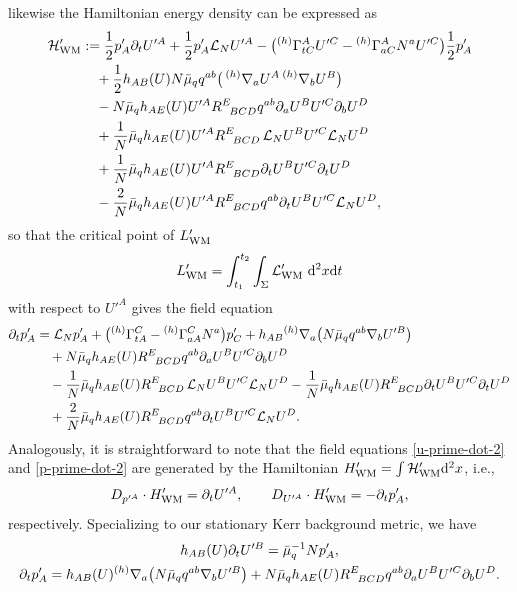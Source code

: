 \documentclass[pdftex]{sigma}
\def\ptl{\partial}%
\def\grad{{\nabla}}%
\newcommand{\leftexp}[2]{{\vphantom{#2}}^{#1}{#2}}
\def\halb{\frac{1}{2}}%
\numberwithin{equation}{section}
\begin{document}
likewise the Hamiltonian energy density can be expressed as
\begin{align*}
\mathcal{H}'_{{\rm WM}}
& := \halb p'_A \ptl_t U'^A + \halb p'_A \mathcal{L}_N U'^A -\bigl(\leftexp{(h)}{\Gamma}^A_{tC} U'^C - \leftexp{(h)}{\Gamma}^A_{a C} N^a U'^C \bigr)\halb p'_A \notag\\
&\quad{}+\halb h_{AB}(U) N \bar{\mu}_q q^{ab} \bigl(\,\leftexp{(h)}{\grad}_a U^A \, \leftexp{(h)}{\grad}_b U^B \bigr) \notag\\
&\quad{} - N \bar{\mu}_q h_{AE}(U) U'^A R^E_{\,\,\,\,BCD} q^{a b} \ptl_a U^B U'^C \ptl_b U^D \notag\\
&\quad{} +\frac{1}{N} \bar{\mu}_q h_{AE}(U) U'^A R^E_{\,\,\,\,BCD} \, \mathcal{L}_N U^B U'^C \mathcal{L}_N U^D \notag\\
&\quad{} + \frac{1}{N} \bar{\mu}_q h_{AE}(U) U'^A R^E_{\,\,\,\,BCD} \ptl_t U^B U'^C \ptl_t U^D \notag\\
&\quad{} - \frac{2}{N}\bar{\mu}_q h_{AE}(U) U'^A R^E_{\,\,\,\,BCD} q^{a b} \ptl_t U^B U'^C \mathcal{L}_N U^D,
\end{align*}
so that the critical point of $L'_{{\rm WM}}$
\begin{align*}
L'_{{\rm WM}} = \int^{t_2}_{t_1} \int_{\Sigma} \mathcal{L}'_{{\rm WM}} \,\, {\rm d}^2x {\rm d}t
\end{align*}
with respect to $U'^A$ gives the field equation
\begin{align}
\ptl_t p'_A &{}= \mathcal{L}_N p'_A + \bigl(\leftexp{(h)}{\Gamma} ^C_{tA} - \leftexp{(h)}{\Gamma}^C_{aA} N^a\bigr)p'_C + h_{AB} \leftexp{(h)}{\grad}_a \bigl(N \bar{\mu}_q q^{ab} \grad_b U'^B\bigr) \notag\\
&\quad{} + N \bar{\mu}_q h_{AE}(U) R^E_{\,\,\,\,BCD} q^{a b} \ptl_a U^B U'^C \ptl_b U^D \notag\\
&\quad{} -\frac{1}{N} \bar{\mu}_q h_{AE}(U) R^E_{\,\,\,\,BCD} \, \mathcal{L}_N U^B U'^C \mathcal{L}_N U^D
 - \frac{1}{N} \bar{\mu}_q h_{AE}(U) R^E_{\,\,\,\,BCD} \ptl_t U^B U'^C \ptl_t U^D \notag\\
&\quad{} + \frac{2}{N}\bar{\mu}_q h_{AE}(U) R^E_{\,\,\,\,BCD} q^{a b} \ptl_t U^B U'^C \mathcal{L}_N U^D.\label{p-prime-dot-2}
\end{align}
Analogously, it is straightforward to note that the field equations \eqref{u-prime-dot-2} and \eqref{p-prime-dot-2} are generated by the Hamiltonian $H'_{{\rm WM}} = \int \mathcal{H}'_{{\rm WM}} {\rm d}^2 x$, i.e.,
\begin{align*}
D_{p'^A} \cdot H'_{{\rm WM}} = \ptl_t U'^A, \qquad D_{U'^A} \cdot H'_{{\rm WM}} = - \ptl_t p'_A,
\end{align*}
respectively. Specializing to our stationary Kerr background metric, we have
\begin{gather*}
 h_{AB}(U) \ptl_t U'^B= \bar{\mu}^{-1}_q N p'_A, \\
\ptl_t p'_A = h_{AB} (U) \leftexp{(h)}{\grad}_a \bigl(N \bar{\mu}_q q^{ab} \grad_b U'^B\bigr) + N \bar{\mu}_q h_{AE}(U) R^E_{\,\,\,\,BCD} q^{a b} \ptl_a U^B U'^C \ptl_b U^D.
\end{gather*}
\end{document}

